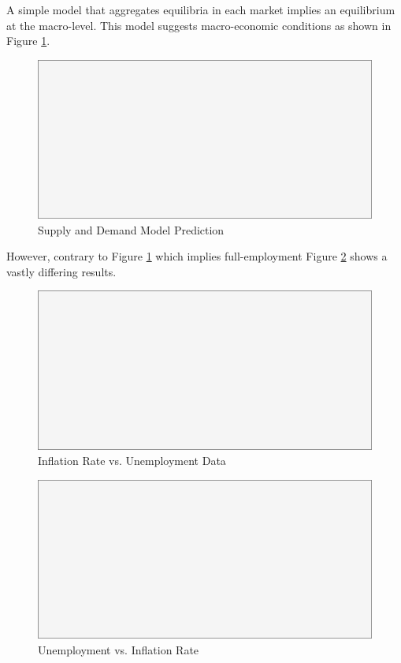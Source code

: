 A simple model that aggregates equilibria in each market implies an equilibrium at the macro-level.
This model suggests macro-economic conditions as shown in Figure
\ref{fig:supply_and_demand_prediction}.

\begin{figure}[H]
\centering
\includegraphics[scale=0.48]{blank}
\caption{Supply and Demand Model Prediction}
\label{fig:supply_and_demand_prediction}
\end{figure}

However, contrary to Figure \ref{fig:supply_and_demand_prediction} which implies full-employment
Figure \ref{fig:ui_all_data} shows a vastly differing results.

\begin{figure}[H]
\centering
\includegraphics[scale=0.48]{blank}
\caption{Inflation Rate vs. Unemployment Data}
\label{fig:ui_all_data}
\end{figure}

\begin{figure}[H]
\centering
\includegraphics[scale=0.48]{blank}
\caption{Unemployment vs. Inflation Rate}
\label{fig:ui}
\end{figure}

